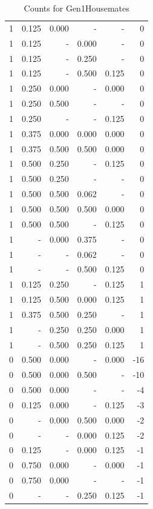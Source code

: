 \documentclass[a4paper]{article}\usepackage[]{graphicx}\usepackage[]{color}
\begin{document}
\begin{table}[ht]
\begin{tabular}{rrrrrr}
  1 & 0.125 & 0.000 & - & - & 0 \\ 
   \rowcolor{sosoColor} 1 & 0.125 & - & 0.000 & - & 0 \\ 
   \rowcolor{sosoColor} 1 & 0.125 & - & 0.250 & - & 0 \\ 
   \rowcolor{sosoColor} 1 & 0.125 & - & 0.500 & 0.125 & 0 \\ 
  1 & 0.250 & 0.000 & - & 0.000 & 0 \\ 
  1 & 0.250 & 0.500 & - & - & 0 \\ 
   \rowcolor{nullColor} 1 & 0.250 & - & - & 0.125 & 0 \\ 
   \rowcolor{goodColor} 1 & 0.375 & 0.000 & 0.000 & 0.000 & 0 \\ 
   \rowcolor{goodColor} 1 & 0.375 & 0.500 & 0.500 & 0.000 & 0 \\ 
  1 & 0.500 & 0.250 & - & 0.125 & 0 \\ 
  1 & 0.500 & 0.250 & - & - & 0 \\ 
   \rowcolor{badColor} 1 & 0.500 & 0.500 & 0.062 & - & 0 \\ 
   \rowcolor{goodColor} 1 & 0.500 & 0.500 & 0.500 & 0.000 & 0 \\ 
  1 & 0.500 & 0.500 & - & 0.125 & 0 \\ 
   \rowcolor{badColor} 1 & - & 0.000 & 0.375 & - & 0 \\ 
   \rowcolor{sosoColor} 1 & - & - & 0.062 & - & 0 \\ 
   \rowcolor{sosoColor} 1 & - & - & 0.500 & 0.125 & 0 \\ 
  1 & 0.125 & 0.250 & - & 0.125 & 1 \\ 
   \rowcolor{badColor} 1 & 0.125 & 0.500 & 0.000 & 0.125 & 1 \\ 
   \rowcolor{badColor} 1 & 0.375 & 0.500 & 0.250 & - & 1 \\ 
   \rowcolor{goodColor} 1 & - & 0.250 & 0.250 & 0.000 & 1 \\ 
   \rowcolor{badColor} 1 & - & 0.500 & 0.250 & 0.125 & 1 \\ 
  0 & 0.500 & 0.000 & - & 0.000 & -16 \\ 
   \rowcolor{badColor} 0 & 0.500 & 0.000 & 0.500 & - & -10 \\ 
  0 & 0.500 & 0.000 & - & - & -4 \\ 
  0 & 0.125 & 0.000 & - & 0.125 & -3 \\ 
   \rowcolor{badColor} 0 & - & 0.000 & 0.500 & 0.000 & -2 \\ 
   \rowcolor{sosoColor} 0 & - & - & 0.000 & 0.125 & -2 \\ 
   \rowcolor{sosoColor} 0 & 0.125 & - & 0.000 & 0.125 & -1 \\ 
  0 & 0.750 & 0.000 & - & 0.000 & -1 \\ 
  0 & 0.750 & 0.000 & - & - & -1 \\ 
   \rowcolor{sosoColor} 0 & - & - & 0.250 & 0.125 & -1 \\ 
   \hline
\end{tabular}
\caption{Counts for Gen1Housemates} 
\end{table}
\end{document}
